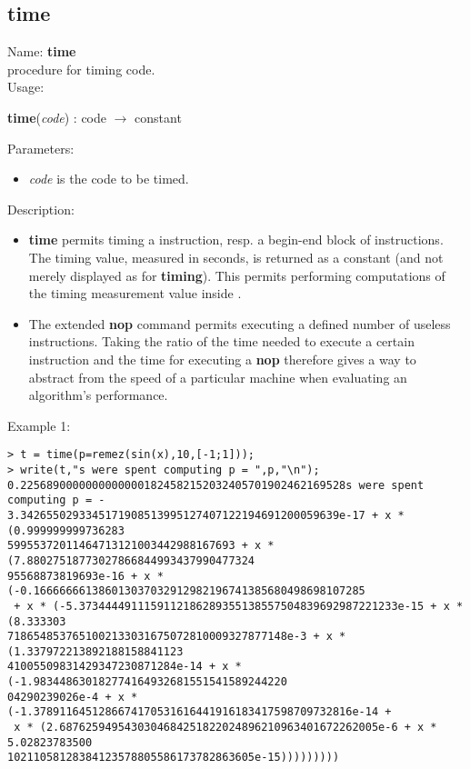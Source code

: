 \subsection{time}
\label{labtime}
\noindent Name: \textbf{time}\\
procedure for timing \sollya code.\\
\noindent Usage: 
\begin{center}
\textbf{time}(\emph{code}) : \textsf{code} $\rightarrow$ \textsf{constant}\\
\end{center}
Parameters: 
\begin{itemize}
\item \emph{code} is the code to be timed.
\end{itemize}
\noindent Description: \begin{itemize}

\item \textbf{time} permits timing a \sollya instruction, resp. a begin-end block
   of \sollya instructions. The timing value, measured in seconds, is returned
   as a \sollya constant (and not merely displayed as for \textbf{timing}). This 
   permits performing computations of the timing measurement value inside \sollya.

\item The extended \textbf{nop} command permits executing a defined number of
   useless instructions. Taking the ratio of the time needed to execute a
   certain \sollya instruction and the time for executing a \textbf{nop}
   therefore gives a way to abstract from the speed of a particular 
   machine when evaluating an algorithm's performance.
\end{itemize}
\noindent Example 1: 
\begin{center}\begin{minipage}{15cm}\begin{Verbatim}[frame=single]
> t = time(p=remez(sin(x),10,[-1;1]));
> write(t,"s were spent computing p = ",p,"\n");
0.22568900000000000001824582152032405701902462169528s were spent computing p = -
3.3426550293345171908513995127407122194691200059639e-17 + x * (0.999999999736283
59955372011464713121003442988167693 + x * (7.88027518773027866844993437990477324
95568873819693e-16 + x * (-0.166666661386013037032912982196741385680498698107285
 + x * (-5.3734444911159112186289355138557504839692987221233e-15 + x * (8.333303
7186548537651002133031675072810009327877148e-3 + x * (1.337972213892188158841123
41005509831429347230871284e-14 + x * (-1.983448630182774164932681551541589244220
04290239026e-4 + x * (-1.3789116451286674170531616441916183417598709732816e-14 +
 x * (2.6876259495430304684251822024896210963401672262005e-6 + x * 5.02823783500
10211058128384123578805586173782863605e-15)))))))))
\end{Verbatim}
\end{minipage}\end{center}
